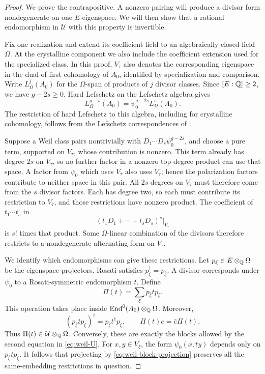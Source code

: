 \begin{proof}
We prove the contrapositive.  A nonzero pairing will produce a divisor
form nondegenerate on one $E$-eigenspace.  We will then show that a
rational endomorphism in $\mathcal U$ with this property is invertible.

Fix one realization and extend its coefficient field to an
algebraically closed field $\Omega$.  At the crystalline component we
also include the coefficient extension used for the specialized
class.  In this proof, $V_\tau$ also denotes the corresponding
eigenspace in the dual of first cohomology of $A_0$, identified by
specialization and comparison.  Write $L^j_\Omega(A_0)$ for the $\Omega$-span of products of
$j$ divisor classes.  Since $[E:\mathbb Q]\geq2$, we have $g-2s\geq0$.
Hard Lefschetz on the Lefschetz algebra gives
\begin{equation}\label{eq:weil-hard-lefschetz}
 L^{g-s}_\Omega(A_0)
        =\psi_0^{g-2s}L^s_\Omega(A_0).
\end{equation}
The restriction of hard Lefschetz to this algebra, including for
crystalline cohomology, follows from the Lefschetz correspondences
of \cite[Theorem~5.9]{Milne1999}.

Suppose a Weil class pairs nontrivially with
$D_1\cdots D_s\psi_0^{g-2s}$, and choose a pure term, supported on
$V_\tau$, whose contribution is nonzero.  This term already has
degree $2s$ on $V_\tau$, so no further factor in a nonzero top-degree
product can use that space.  A factor from $\psi_0$ which uses
$V_{\bar\tau}$ also uses $V_\tau$; hence the polarization factors
contribute to neither space in this pair.  All $2s$ degrees on
$V_{\bar\tau}$ must therefore come from the $s$ divisor factors.
Each has degree two, so each must contribute its restriction to
$V_{\bar\tau}$, and those restrictions have nonzero product.
The coefficient of $t_1\cdots t_s$ in
\[
 (t_1D_1+\cdots+t_sD_s)^s\big|_{V_{\bar\tau}}
\]
is $s!$ times that product.  Some $\Omega$-linear combination of the
divisors therefore restricts to a nondegenerate alternating form on
$V_{\bar\tau}$.

We identify which endomorphisms can give these restrictions.  Let
$p_\xi\in E\otimes_\mathbb Q\Omega$ be the eigenspace projectors.  Rosati
satisfies $p_\xi^\dagger=p_{\bar\xi}$.  A divisor corresponds under
$\psi_0$ to a Rosati-symmetric endomorphism $t$.  Define
\begin{equation}\label{eq:weil-block-projection}
 \Pi(t)=\sum_\xi p_{\bar\xi}t p_\xi.
\end{equation}
This operation takes place inside
$\operatorname{End}^0(A_0)\otimes_\mathbb Q\Omega$.  Moreover,
\[
 (p_{\bar\xi}t p_\xi)^\dagger
       =p_{\bar\xi}t^\dagger p_\xi,
 \qquad
 \Pi(t)e=\bar e\Pi(t).
\]
Thus $\Pi(t)\in\mathcal U\otimes_\mathbb Q\Omega$.  Conversely, these are
exactly the blocks allowed by the second equation in
\eqref{eq:weil-U}.  For $x,y\in V_\xi$, the form
$\psi_0(x,ty)$ depends only on $p_{\bar\xi}t p_\xi$.
It follows that projecting by \eqref{eq:weil-block-projection}
preserves all the same-embedding restrictions in question.


\end{proof}
